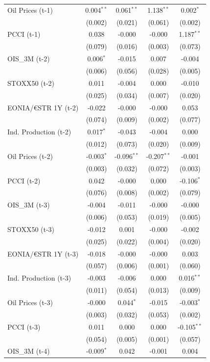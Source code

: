 \begin{longtable}[t]{lcccc}
Oil Prices (t-1) & 0.004$^{**}$ & 0.061$^{**}$ & 1.138$^{**}$ & 0.002$^{*}$\\
 & (0.002) & (0.021) & (0.061) & (0.002)\\
PCCI (t-1) & 0.038 & -0.000 & -0.000 & 1.187$^{**}$\\
 & (0.079) & (0.016) & (0.003) & (0.073)\\
OIS\_3M (t-2) & 0.006$^{*}$ & -0.015 & 0.007 & -0.004\\
 & (0.006) & (0.056) & (0.028) & (0.005)\\
STOXX50 (t-2) & 0.011 & -0.004 & 0.000 & -0.010\\
 & (0.025) & (0.034) & (0.007) & (0.020)\\
EONIA/€STR 1Y (t-2) & -0.022 & -0.000 & -0.000 & 0.053\\
 & (0.074) & (0.009) & (0.002) & (0.077)\\
Ind. Production (t-2) & 0.017$^{*}$ & -0.043 & -0.004 & 0.000\\
 & (0.012) & (0.073) & (0.020) & (0.009)\\
Oil Prices (t-2) & -0.003$^{*}$ & -0.096$^{**}$ & -0.207$^{**}$ & -0.001\\
 & (0.003) & (0.032) & (0.072) & (0.003)\\
PCCI (t-2) & 0.042 & -0.000 & 0.000 & -0.106$^{*}$\\
 & (0.076) & (0.008) & (0.002) & (0.079)\\
OIS\_3M (t-3) & -0.004 & -0.011 & -0.000 & -0.000\\
 & (0.006) & (0.053) & (0.019) & (0.005)\\
STOXX50 (t-3) & -0.012 & 0.001 & -0.000 & -0.002\\
 & (0.025) & (0.022) & (0.004) & (0.020)\\
EONIA/€STR 1Y (t-3) & -0.018 & -0.000 & -0.000 & 0.003\\
 & (0.057) & (0.006) & (0.001) & (0.060)\\
Ind. Production (t-3) & -0.003 & -0.006 & 0.000 & 0.016$^{**}$\\
 & (0.011) & (0.054) & (0.013) & (0.009)\\
Oil Prices (t-3) & -0.000 & 0.044$^{*}$ & -0.015 & -0.003$^{*}$\\
 & (0.003) & (0.032) & (0.053) & (0.002)\\
PCCI (t-3) & 0.011 & 0.000 & 0.000 & -0.105$^{**}$\\
 & (0.054) & (0.005) & (0.001) & (0.057)\\
OIS\_3M (t-4) & -0.009$^{*}$ & 0.042 & -0.001 & 0.004\\

\end{longtable}

